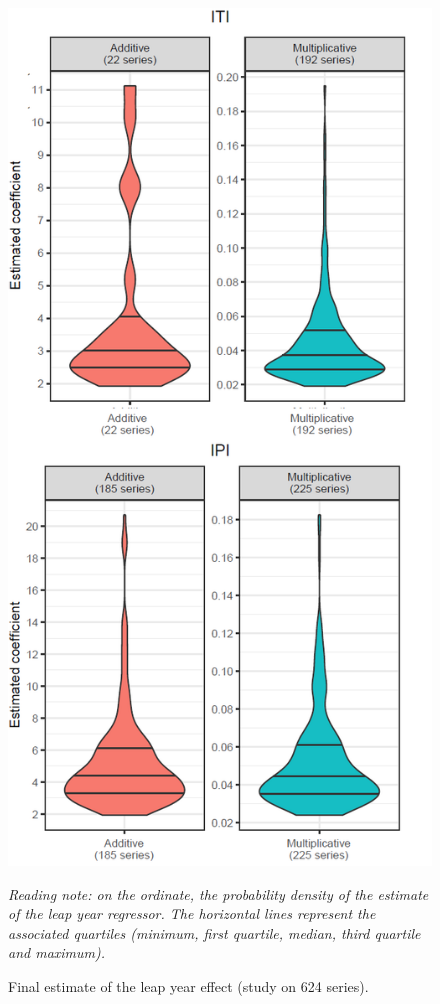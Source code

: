 \documentclass[12pt, a4paper]{article}
\begin{document}
\begin{figure}[!ht]
\begin{center}
 \includegraphics[scale=0.65]{img/LYvaleur2.png}
 \caption[Final estimate of the leap year effect (study on 624 series)]{Final estimate of the leap year effect (study on 624 series).}
 \label{fig:LYvaleur}
\end{center}
\vspace{-0.3cm}
\footnotesize\emph{%
Reading note: on the ordinate, the probability density of the estimate of the leap year regressor. The horizontal lines represent the associated quartiles (minimum, first quartile, median, third quartile and maximum).}
\end{figure}
\end{document}
